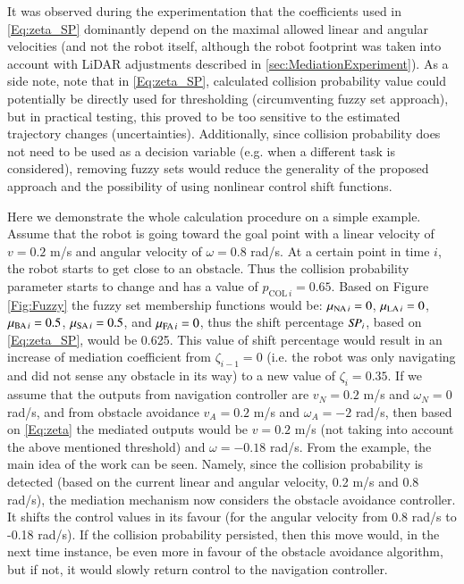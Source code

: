 It was observed during the experimentation that the coefficients used in \cref{Eq:zeta_SP} dominantly depend on the maximal allowed linear and angular velocities (and not the robot itself, although the robot footprint was taken into account with LiDAR adjustments described in \cref{sec:MediationExperiment}). As a side note, note that in \cref{Eq:zeta_SP}, calculated collision probability value could potentially be directly used for thresholding (circumventing fuzzy set approach), but in practical testing, this proved to be too sensitive to the estimated trajectory changes (uncertainties). Additionally, since collision probability does not need to be used as a decision variable (e.g. when a different task is considered), removing fuzzy sets would reduce the generality of the proposed approach and the possibility of using nonlinear control shift functions. 

Here we demonstrate the whole calculation procedure on a simple example. Assume that the robot is going toward the goal point with a linear velocity of $v=0.2$ m/s and angular velocity of $\omega = 0.8$ rad/s. At a certain point in time $i$, the robot starts to get close to an obstacle. Thus the collision probability parameter starts to change and has a value of $p_{\textrm{COL}\,i}=0.65$. Based on Figure \ref{Fig:Fuzzy} the fuzzy set membership functions would be: $\mu_{{\textrm{NA}}\,i}=0$, $\mu_{{\textrm{LA}}\,i}=0$, $\mu_{{\textrm{BA}}\,i}=0.5$, $\mu_{{\textrm{SA}}\,i}=0.5$, and $\mu_{{\textrm{FA}}\,i}=0$, thus the shift percentage $\mathit{SP}_i$, based on \cref{Eq:zeta_SP}, would be 0.625. This value of shift percentage would result in an increase of mediation coefficient from $\zeta_{i-1} = 0$ (i.e. the robot was only navigating and did not sense any obstacle in its way) to a new value of $\zeta_i=0.35$. If we assume that the outputs from navigation controller are $v_N = 0.2$ m/s and $\omega_N = 0$ rad/s, and from obstacle avoidance $v_A = 0.2$ m/s and $\omega_A = -2$ rad/s, then based on \cref{Eq:zeta} the mediated outputs would be $v = 0.2$ m/s (not taking into account the above mentioned threshold) and $\omega = -0.18$ rad/s. From the example, the main idea of the work can be seen. Namely, since the collision probability is detected (based on the current linear and angular velocity, 0.2 m/s and 0.8 rad/s), the mediation mechanism now considers the obstacle avoidance controller. It shifts the control values in its favour (for the angular velocity from 0.8 rad/s to -0.18 rad/s). If the collision probability persisted, then this move would, in the next time instance, be even more in favour of the obstacle avoidance algorithm, but if not, it would slowly return control to the navigation controller.

